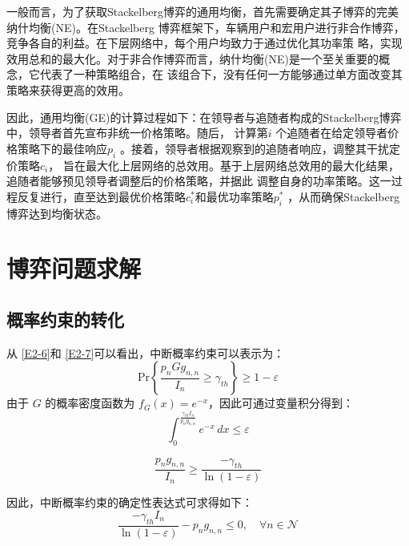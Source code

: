一般而言，为了获取Stackelberg博弈的通用均衡，首先需要确定其子博弈的完美纳什均衡(NE)。在Stackelberg
博弈框架下，车辆用户和宏用户进行非合作博弈，竞争各自的利益。在下层网络中，每个用户均致力于通过优化其功率策
略，实现效用总和的最大化。对于非合作博弈而言，纳什均衡(NE)是一个至关重要的概念，它代表了一种策略组合，在
该组合下，没有任何一方能够通过单方面改变其策略来获得更高的效用。


因此，通用均衡(GE)的计算过程如下：在领导者与追随者构成的Stackelberg博弈中，领导者首先宣布非统一价格策略。随后，
计算第$i$ 个追随者在给定领导者价格策略下的最佳响应$p_i$ 。接着，领导者根据观察到的追随者响应，调整其干扰定价策略$c_i$，
旨在最大化上层网络的总效用。基于上层网络总效用的最大化结果，追随者能够预见领导者调整后的价格策略，并据此
调整自身的功率策略。这一过程反复进行，直至达到最优价格策略$c_i^*$和最优功率策略$p_i^*$
，从而确保Stackelberg博弈达到均衡状态。
\section{博弈问题求解}\label{section2-3}
\subsection{概率约束的转化}\label{section2-3-1}
从 \eqref{E2-6}和 \eqref{E2-7}可以看出，中断概率约束可以表示为：
\begin{equation}\label{E2-15}
\textrm{Pr}\left\{\frac{p_{n}G g_{n,n}}{I_n} \geq \gamma_{th}\right\}\geq1-\varepsilon
\end{equation}
由于 $G$ 的概率密度函数为 $f_G (x)=e^{-x}$，因此可通过变量积分得到：
\begin{equation}\label{E2-16}
\int_{0}^{\frac{\gamma_{th}I_{n}}{p_n g_{n,n}}} e^{-x}\, dx\leq\varepsilon
\end{equation}

\begin{equation}\label{E2-17}
\frac{p_n g_{ n,n}}{I_{n}}\geq\frac{-\gamma_{th}}{\ln(1-\varepsilon)}
\end{equation}

因此，中断概率约束的确定性表达式可求得如下：
\begin{equation}\label{E2-18}
\frac{-\gamma_{th} I_{n}}{\ln(1-\varepsilon)}-p_n g_{n,n}\leq0,\quad\forall n\in\mathcal{N}
\end{equation}
